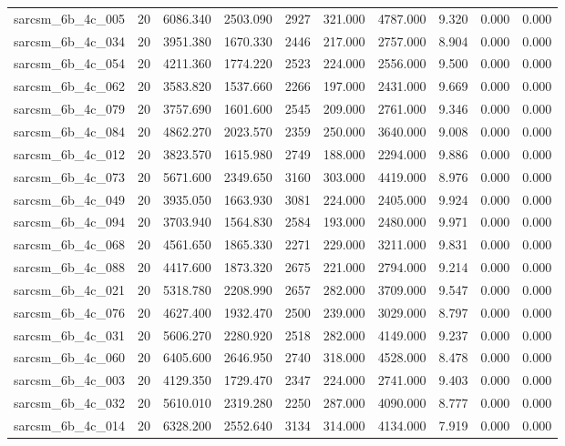 \begin{tabular}{lrrrrrrrrr}
sarcsm\_6b\_4c\_005 & 20 & 6086.340 & 2503.090 & 2927 & 321.000 & 4787.000 & 9.320 & 0.000 & 0.000 \\
sarcsm\_6b\_4c\_034 & 20 & 3951.380 & 1670.330 & 2446 & 217.000 & 2757.000 & 8.904 & 0.000 & 0.000 \\
sarcsm\_6b\_4c\_054 & 20 & 4211.360 & 1774.220 & 2523 & 224.000 & 2556.000 & 9.500 & 0.000 & 0.000 \\
sarcsm\_6b\_4c\_062 & 20 & 3583.820 & 1537.660 & 2266 & 197.000 & 2431.000 & 9.669 & 0.000 & 0.000 \\
sarcsm\_6b\_4c\_079 & 20 & 3757.690 & 1601.600 & 2545 & 209.000 & 2761.000 & 9.346 & 0.000 & 0.000 \\
sarcsm\_6b\_4c\_084 & 20 & 4862.270 & 2023.570 & 2359 & 250.000 & 3640.000 & 9.008 & 0.000 & 0.000 \\
sarcsm\_6b\_4c\_012 & 20 & 3823.570 & 1615.980 & 2749 & 188.000 & 2294.000 & 9.886 & 0.000 & 0.000 \\
sarcsm\_6b\_4c\_073 & 20 & 5671.600 & 2349.650 & 3160 & 303.000 & 4419.000 & 8.976 & 0.000 & 0.000 \\
sarcsm\_6b\_4c\_049 & 20 & 3935.050 & 1663.930 & 3081 & 224.000 & 2405.000 & 9.924 & 0.000 & 0.000 \\
sarcsm\_6b\_4c\_094 & 20 & 3703.940 & 1564.830 & 2584 & 193.000 & 2480.000 & 9.971 & 0.000 & 0.000 \\
sarcsm\_6b\_4c\_068 & 20 & 4561.650 & 1865.330 & 2271 & 229.000 & 3211.000 & 9.831 & 0.000 & 0.000 \\
sarcsm\_6b\_4c\_088 & 20 & 4417.600 & 1873.320 & 2675 & 221.000 & 2794.000 & 9.214 & 0.000 & 0.000 \\
sarcsm\_6b\_4c\_021 & 20 & 5318.780 & 2208.990 & 2657 & 282.000 & 3709.000 & 9.547 & 0.000 & 0.000 \\
sarcsm\_6b\_4c\_076 & 20 & 4627.400 & 1932.470 & 2500 & 239.000 & 3029.000 & 8.797 & 0.000 & 0.000 \\
sarcsm\_6b\_4c\_031 & 20 & 5606.270 & 2280.920 & 2518 & 282.000 & 4149.000 & 9.237 & 0.000 & 0.000 \\
sarcsm\_6b\_4c\_060 & 20 & 6405.600 & 2646.950 & 2740 & 318.000 & 4528.000 & 8.478 & 0.000 & 0.000 \\
sarcsm\_6b\_4c\_003 & 20 & 4129.350 & 1729.470 & 2347 & 224.000 & 2741.000 & 9.403 & 0.000 & 0.000 \\
sarcsm\_6b\_4c\_032 & 20 & 5610.010 & 2319.280 & 2250 & 287.000 & 4090.000 & 8.777 & 0.000 & 0.000 \\
sarcsm\_6b\_4c\_014 & 20 & 6328.200 & 2552.640 & 3134 & 314.000 & 4134.000 & 7.919 & 0.000 & 0.000 \\

\end{tabular}

